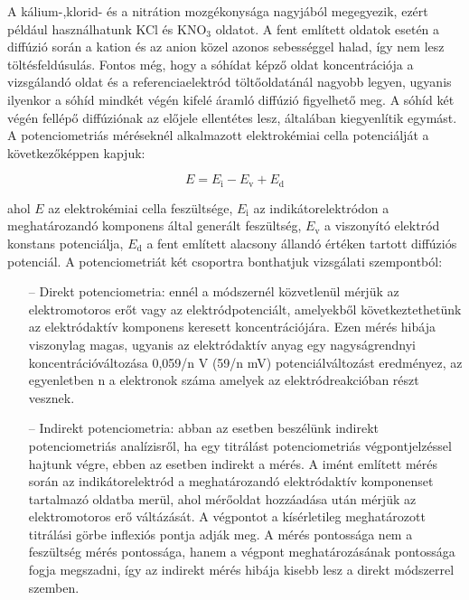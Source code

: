 A kálium-,klorid- és a nitrátion mozgékonysága nagyjából megegyezik, ezért például használhatunk KCl és KNO$_3$ oldatot.
A fent említett oldatok esetén a diffúzió során a kation és az anion közel azonos sebességgel halad, így nem lesz töltésfeldúsulás. Fontos még, hogy a sóhídat képző oldat koncentrációja a vizsgálandó oldat és a referenciaelektród töltőoldatánál nagyobb legyen, ugyanis ilyenkor a sóhíd mindkét végén kifelé áramló diffúzió figyelhető meg. A sóhíd két végén fellépő diffúziónak az előjele ellentétes lesz, általában kiegyenlítik egymást. A potenciometriás méréseknél alkalmazott elektrokémiai cella potenciálját a következőképpen kapjuk:

\begin{equation}
E= E_\text{i} - E_\text{v} + E_\text{d}
\end{equation}

ahol $E$ az elektrokémiai cella feszültsége, $E_\text{i}$ az indikátorelektródon a meghatározandó komponens által generált feszültség, $E_\text{v}$ a viszonyító elektród konstans potenciálja, $E_\text{d}$ a fent említett alacsony állandó értéken tartott diffúziós potenciál.
A potenciometriát két csoportra bonthatjuk vizsgálati szempontból: 

\begin{itemize}
\item[--]Direkt potenciometria: ennél a módszernél közvetlenül mérjük az elektromotoros erőt vagy az elektródpotenciált, amelyekből következtethetünk az elektródaktív komponens keresett koncentrációjára. Ezen mérés hibája viszonylag magas, ugyanis az elektródaktív anyag egy nagyságrendnyi koncentrációváltozása 0,059/n V (59/n mV) potenciálváltozást eredményez, az egyenletben n a elektronok száma amelyek az elektródreakcióban részt vesznek.
\item[--]Indirekt potenciometria: abban az esetben beszélünk indirekt potenciometriás analízisről, ha egy titrálást potenciometriás végpontjelzéssel hajtunk végre, ebben az esetben indirekt a mérés. A imént említett mérés során az indikátorelektród a meghatározandó elektródaktív komponenset tartalmazó oldatba merül, ahol mérőoldat hozzáadása után mérjük az elektromotoros erő váltázását. A végpontot a kísérletileg meghatározott titrálási görbe inflexiós pontja adják meg. A mérés pontossága nem a feszültség mérés  pontossága, hanem a végpont meghatározásának pontossága fogja megszadni, így az indirekt mérés hibája kisebb lesz a direkt módszerrel szemben.
\end{itemize}

